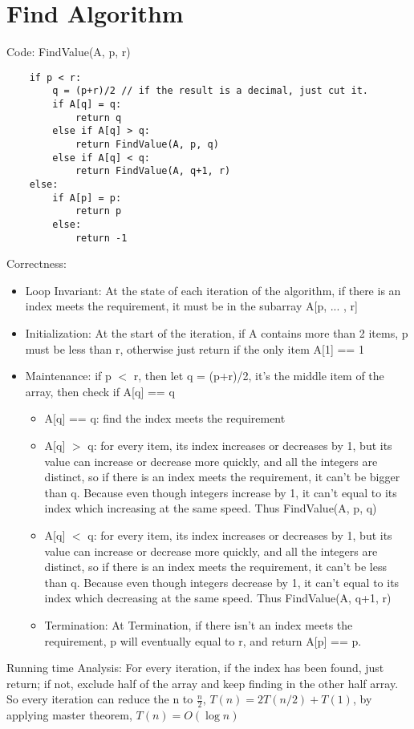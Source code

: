 \documentclass[12pt]{article}
\begin{document}
\section{Find Algorithm}
Code: FindValue(A, p, r)
\begin{lstlisting}
    if p < r:
        q = (p+r)/2 // if the result is a decimal, just cut it.
        if A[q] = q:
            return q
        else if A[q] > q:
            return FindValue(A, p, q)
        else if A[q] < q:
            return FindValue(A, q+1, r)
    else:
        if A[p] = p:
            return p
        else:
            return -1
\end{lstlisting}
Correctness:
\begin{itemize}
    \item Loop Invariant: At the state of each iteration of the algorithm, if there is an index meets the requirement, it must be in the subarray A[p, ... , r] 
    \item Initialization: At the start of the iteration, if A contains more than 2 items, p must be less than r, otherwise just return if the only item A[1] == 1
    \item Maintenance: if p $<$ r, then let q = (p+r)/2, it's the middle item of the array, then check if A[q] == q \begin{itemize}
        \item A[q] == q: find the index meets the requirement
        \item A[q] $>$ q: for every item, its index increases or decreases by 1, but its value can increase or decrease more quickly, and all the integers are distinct, so if there is an index meets the requirement, it can't be bigger than q. Because even though integers increase by 1, it can't equal to its index which increasing at the same speed. Thus FindValue(A, p, q)
        \item A[q] $<$ q: for every item, its index increases or decreases by 1, but its value can increase or decrease more quickly, and all the integers are distinct, so if there is an index meets the requirement, it can't be less than q. Because even though integers decrease by 1, it can't equal to its index which decreasing at the same speed. Thus FindValue(A, q+1, r)
    \item Termination: At Termination, if there isn't an index meets the requirement, p will eventually equal to r, and return A[p] == p.
    \end{itemize}
\end{itemize}
Running time Analysis: For every iteration, if the index has been found, just return; if not, exclude half of the array and keep finding in the other half array. So every iteration can reduce the n to $\frac{n}{2}$, $T(n) = 2T(n/2) + T(1)$, by applying master theorem, $T(n) = O (\log n)$
\end{document}
